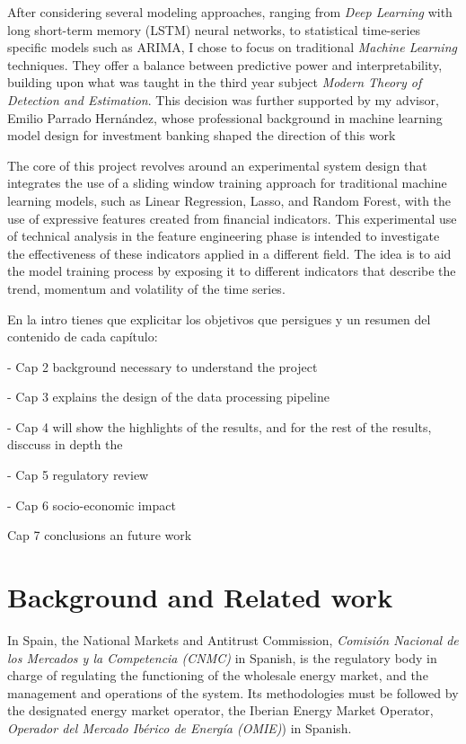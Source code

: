 \documentclass[12pt]{report} %
\begin{document}
After considering several modeling approaches, ranging from \textit{Deep Learning} with long short-term memory (LSTM) neural networks, to statistical time-series specific models such as ARIMA, I chose to focus on traditional \textit{Machine Learning} techniques. They offer a balance between predictive power and interpretability, building upon what was taught in the third year subject \textit{Modern Theory of Detection and Estimation}. This decision was further supported by my advisor, Emilio Parrado Hernández, whose professional background in machine learning model design for investment banking shaped the direction of this work

The core of this project revolves around an experimental system design that integrates the use of a sliding window training approach for traditional machine learning models, such as Linear Regression, Lasso, and Random Forest, with the use of expressive features created from financial indicators. This experimental use of technical analysis in the feature engineering phase is intended to investigate the effectiveness of these indicators applied in a different field. The idea is to aid the model training process by exposing it to different indicators that describe the trend, momentum and volatility of the time series.

En la intro tienes que explicitar los objetivos que persigues y un resumen del contenido de cada capítulo:

- Cap 2 background necessary to understand the project

- Cap 3 explains the design of the data processing pipeline

- Cap 4 will show the highlights of the results, and for the rest of the results, disccuss in depth the

- Cap 5 regulatory review

- Cap 6 socio-economic impact

Cap 7 conclusions an future work



\chapter{Background and Related work}
In Spain, the National Markets and Antitrust Commission, \textit{Comisión Nacional de los Mercados y la Competencia (CNMC)} in Spanish, is the regulatory body in charge of regulating the functioning of the wholesale energy market, and the management and operations of the system. \cite{boe_cnmc_BOE-A-2019-17287} Its methodologies must be followed by the designated energy market operator, the Iberian Energy Market Operator, \textit{Operador del Mercado Ibérico de Energía (OMIE)}) in Spanish.
\end{document}
